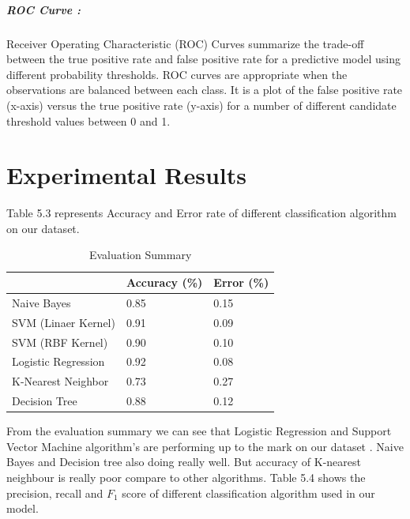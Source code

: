 \subparagraph{ROC Curve :}
Receiver Operating Characteristic (ROC) Curves summarize the trade-off between the true positive rate and false positive rate for a predictive model using different probability thresholds. ROC curves are appropriate when the observations are balanced between each class. It is a plot of the false positive rate (x-axis) versus the true positive rate (y-axis) for a number of different candidate threshold values between 0 and 1.

\section{Experimental Results}
Table 5.3 represents Accuracy and Error rate of different classification algorithm on our dataset.
\renewcommand{\arraystretch}{1.5}
\begin{table}[h!]
\begin{center}
\caption{Evaluation Summary}
\begin{tabular}{|m{7cm} | m{3cm}| m{3cm}|}
\hline
     & Accuracy (\%) & Error (\%) \\
\hline
    Naive Bayes & 0.85 & 0.15\\
\hline 
    SVM (Linaer Kernel) & 0.91 & 0.09\\
\hline 
    SVM (RBF Kernel) & 0.90 & 0.10\\
\hline 
    Logistic Regression & 0.92 & 0.08\\
\hline
    K-Nearest Neighbor & 0.73 & 0.27\\
\hline
    Decision Tree & 0.88 & 0.12\\
\hline
\end{tabular}
\end{center}
\end{table}
\par
\noindent
From the evaluation summary we can see that Logistic Regression and Support Vector Machine algorithm's are performing up to the mark on our dataset . Naive Bayes and Decision tree also doing really well. But accuracy of K-nearest neighbour is really poor compare to other algorithms. 
\clearpage
\noindent
Table 5.4 shows the precision, recall and $F_1$ score of different classification algorithm used in our model.

